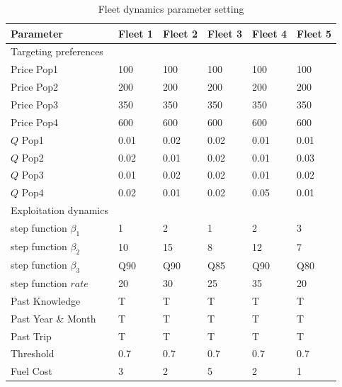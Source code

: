\documentclass[review]{elsarticle}
\begin{document}
\begin{table}[!ht]
\caption{Fleet dynamics parameter setting}
\begin{tabular}{ p{4cm } p{1cm} p{1cm} p{1cm} p{1cm} p{1cm}}
	\hline
	Parameter & Fleet 1 & Fleet 2 & Fleet 3 & Fleet 4 & Fleet 5 \\
	\hline
	Targeting preferences &&&& \\
	\hline
	Price Pop1 & 100 & 100 & 100 & 100 & 100 \\
	Price Pop2 & 200 & 200 & 200 & 200 & 200 \\
	Price Pop3 & 350 & 350 & 350 & 350 & 350 \\
	Price Pop4 & 600 & 600 & 600 & 600 & 600 \\
	$Q$ Pop1 & 0.01 & 0.02 & 0.02 & 0.01 & 0.01 \\
	$Q$ Pop2 & 0.02 & 0.01 & 0.02 & 0.01 & 0.03\\
	$Q$ Pop3 & 0.01 & 0.02 & 0.02 & 0.01 & 0.02 \\
	$Q$ Pop4 & 0.02 & 0.01 & 0.02 & 0.05 & 0.01 \\
	\hline
	Exploitation dynamics &&&& \\
	\hline
	step function $\beta_1$ & 1 & 2 & 1 & 2 & 3 \\
	step function $\beta_2$ & 10 & 15 & 8 & 12 & 7 \\
	step function $\beta_3$ & Q90 & Q90 & Q85 & Q90 & Q80 \\
	step function $rate$ & 20 & 30 & 25 & 35 & 20 \\
	Past Knowledge & T & T & T & T & T \\
	Past Year \& Month & T & T & T & T & T \\
	Past Trip & T & T & T & T & T \\
	Threshold & 0.7 & 0.7 & 0.7 & 0.7 & 0.7 \\
	Fuel Cost & 3 & 2 & 5 & 2 & 1 \\
	\hline
\end{tabular}
\label{tab:2}
\end{table}
\end{document}
